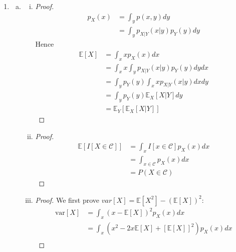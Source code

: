 \documentclass[12pt]{article}
\newcommand{\E}{\mathbb{E}}
\begin{document}
\begin{enumerate}[1)]
\begin {enumerate}[(a)]
\begin{enumerate}[(i)]
\begin{proof}[Disproof]
                Therefore the statement if \emph{False}.
            \end{proof}
\end{enumerate}
\end{enumerate}
	\item
	\begin{enumerate}[(a)]
    	\item
    	\begin{enumerate}[(i)]
			\item
            \begin{proof}
            	\begin{align*}
            		p_{X}(x) & = \int_{y}p(x,y)dy \\
                    & = \int_{y}p_{X|Y}(x|y)p_{Y}(y)dy
                \end{align*}
               	Hence
                \begin{align*}
                	\E[X] & = \int_{x}xp_X(x)dx \\
                    & = \int_{x} x \int_{y} p_{X|Y}(x|y) p_{Y}(y) dy dx \\
                    & = \int_{y} p_{Y}(y) \int_{x} x p_{X|Y}(x|y) dx dy \\
                    & = \int_{y} p_{Y}(y) \E_{X}[X|Y] dy \\
                    & = \E_{Y}[\E_{X}[X|Y]]
                \end{align*}
            \end{proof}
           	\item
            \begin{proof}
            	\begin{align*}
            		\E[I[X \in \mathcal{C}]] & = \int_{x} I[x \in \mathcal{C}]p_{X}(x) dx \\
                	& = \int_{x \in \mathcal{C}} p_{X}(x) dx \\
                	& = P(X \in \mathcal{C})
                \end{align*}
            \end{proof}
            \item 
            \begin{proof}
            	We first prove $var[X] = \E[X^{2}] - (\E[X])^{2}$:
                \begin{align*}
                	\text{var}[X] & = \int_{x} (x - \E[X])^{2} p_{X}(x) dx \\
                    & = \int_{x} (x^{2} - 2x\E[X] + [\E[X]]^{2}) p_{X}(x)dx \\

\end{align*}
\end{proof}
\end{enumerate}
\end{enumerate}
\end{enumerate}
\end{document}
